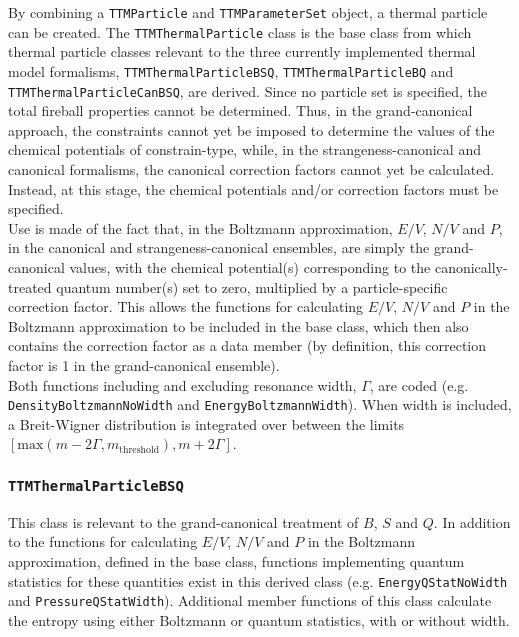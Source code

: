 \documentclass{elsarticle}
\begin{document}
By combining a \texttt{TTMParticle} and \texttt{TTMParameterSet} object, a thermal particle can be 
created. The 
\texttt{TTMThermalParticle} class is the base class from which thermal particle classes relevant 
to the three currently implemented thermal model formalisms, \texttt{TTMThermalParticleBSQ}, 
\texttt{TTMThermalParticleBQ} and \linebreak
\texttt{TTMThermalParticleCanBSQ}, are derived. Since no particle set is 
specified, the total fireball properties cannot be determined. Thus, in the grand-canonical 
approach, the constraints cannot yet be imposed to determine the values of the chemical potentials of constrain-type, while, in the strangeness-canonical and 
canonical formalisms, the canonical correction factors cannot yet be calculated. Instead, at this 
stage, the chemical potentials and/or correction factors must be specified.\\ 

Use is made of the fact that, in the Boltzmann approximation, $E/V$, $N/V$ and $P$, in the canonical 
and strangeness-canonical ensembles, are simply the grand-canonical values, with the chemical 
potential(s) corresponding to the canonically-treated quantum number(s) set to zero, multiplied by a 
particle-specific correction factor. This allows the functions for calculating $E/V$, $N/V$ and $P$ in 
the Boltzmann approximation to be included in the base class, which then also contains the correction 
factor as a data member (by definition, this correction factor is 1 in the grand-canonical ensemble).\\ 

Both functions including and excluding resonance width, $\Gamma$, are coded 
(e.g. \texttt{DensityBoltzmannNoWidth} and \texttt{EnergyBoltzmannWidth}). 
When width is included, a Breit-Wigner 
distribution is integrated over between the limits \linebreak 
$[\mathrm{max}(m-2\Gamma,m_{\mathrm{threshold}}),m+2\Gamma]$.\\

\subsubsection{\texttt{TTMThermalParticleBSQ}}

This class is relevant to the grand-canonical treatment of $B$, $S$ and $Q$. In
 addition to the functions for calculating $E/V$, $N/V$ and $P$ in the Boltzmann approximation, defined 
in the base class, functions implementing quantum statistics for these quantities exist in this 
derived class (e.g. \texttt{EnergyQStatNoWidth} and \texttt{PressureQStatWidth}). Additional member 
functions of this class calculate the entropy using either
 Boltzmann or quantum statistics, with or without width.\\ 
\end{document}
